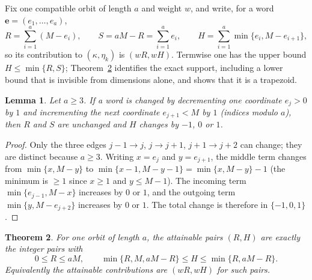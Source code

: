 \documentclass[11pt,a4paper]{article}
\numberwithin{equation}{section}
\theoremstyle{plain}
\newtheorem{theorem}{Theorem}[section]
\newtheorem{lemma}[theorem]{Lemma}
\theoremstyle{definition}
\theoremstyle{remark}
\begin{document}
Fix one compatible orbit of length $a$ and weight $w$, and write, for a word
$\mathbf{e}=(e_1,\ldots,e_a)$,
\[
R=\sum_{i=1}^{a}(M-e_i),\qquad
S=aM-R=\sum_{i=1}^{a}e_i,\qquad
H=\sum_{i=1}^{a}\min\{e_i,M-e_{i+1}\},
\]
so its contribution to $(\kappa,\eta_k)$ is $(wR,wH)$.  Termwise one has the
upper bound $H\leq\min\{R,S\}$; Theorem~\ref{thm:support} identifies the
exact support, including a lower bound that is invisible from dimensions
alone, and shows that it is a trapezoid.

\begin{lemma}\label{lem:transfer-step}
Let $a\geq3$.  If a word is changed by decrementing one coordinate $e_j>0$ by
$1$ and incrementing the next coordinate $e_{j+1}<M$ by $1$ (indices modulo
$a$), then $R$ and $S$ are unchanged and $H$ changes by $-1$, $0$ or $1$.
\end{lemma}

\begin{proof}
Only the three edges $j-1\to j$, $j\to j+1$, $j+1\to j+2$ can change; they are
distinct because $a\geq3$.  Writing $x=e_j$ and $y=e_{j+1}$, the middle term
changes from $\min\{x,M-y\}$ to $\min\{x-1,M-y-1\}=\min\{x,M-y\}-1$ (the
minimum is $\geq1$ since $x\geq1$ and $y\leq M-1$).  The incoming term
$\min\{e_{j-1},M-x\}$ increases by $0$ or $1$, and the outgoing term
$\min\{y,M-e_{j+2}\}$ increases by $0$ or $1$.  The total change is therefore
in $\{-1,0,1\}$.
\end{proof}

\begin{theorem}\label{thm:support}
For one orbit of length $a$, the attainable pairs $(R,H)$ are exactly the
integer pairs with
\begin{equation}\label{eq:trapezoid}
0\leq R\leq aM,\qquad
\min\{R,M,aM-R\}\leq H\leq\min\{R,aM-R\}.
\end{equation}
Equivalently the attainable contributions are $(wR,wH)$ for such pairs.
\end{theorem}
\end{document}
